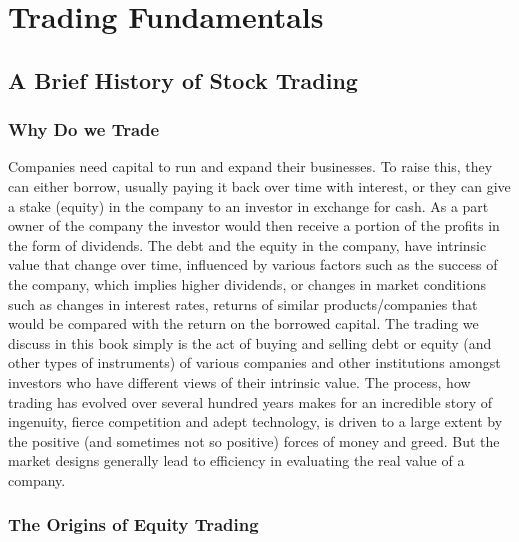 \chapter{Trading Fundamentals}
\section{A Brief History of Stock Trading}
\subsection{Why Do we Trade}

Companies need capital to run and expand their businesses. To raise this, they can either borrow, usually paying it back over time with interest, or they can give a stake (equity) in the company to an investor in exchange for cash. As a part owner of the company the investor would then receive a portion of the profits in the form of dividends. The debt and the equity in the company,  have intrinsic value that change over time, influenced by various factors such as the success of the company, which implies higher dividends, or changes in market conditions such as changes in interest rates, returns of similar products/companies that would be compared with the return on the borrowed capital. The trading we discuss in this book simply is the act of buying and selling debt or equity (and other types of instruments) of various companies and other institutions amongst investors who have different views of their intrinsic value. The process, how trading has evolved over several hundred years makes for an incredible story of ingenuity, fierce competition and adept technology, is driven to a large extent by the positive (and sometimes not so positive) forces of money and greed. But the market designs generally lead to efficiency in evaluating the real value of a company. 


\subsection{The Origins of Equity Trading}



